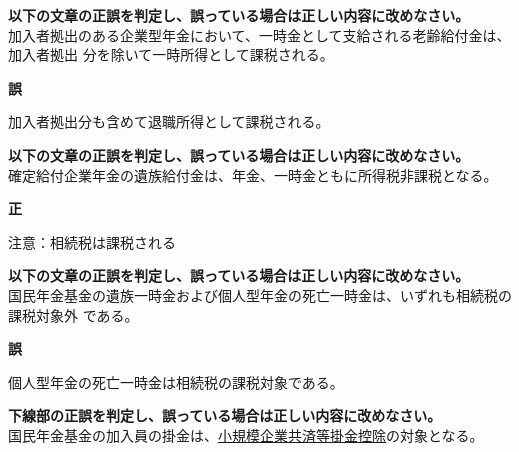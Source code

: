 \begin{truefalse}[年金1 2019 問題2(1)\textcircled{1}]
\textbf{以下の文章の正誤を判定し、誤っている場合は正しい内容に改めなさい。}
\\  

加入者拠出のある企業型年金において、一時金として支給される老齢給付金は、加入者拠出
分を除いて一時所得として課税される。
\end{truefalse}

\begin{answerbox}
  \textbf{誤}

加入者拠出分も含めて退職所得として課税される。
\end{answerbox}

\begin{truefalse}[年金1 2019 問題2(1)\textcircled{2}]
\textbf{以下の文章の正誤を判定し、誤っている場合は正しい内容に改めなさい。}
\\  

確定給付企業年金の遺族給付金は、年金、一時金ともに所得税非課税となる。
\end{truefalse}

\begin{answerbox}
  \textbf{正}
\end{answerbox}

\begin{explanationbox}
  注意：相続税は課税される
\end{explanationbox}



\begin{truefalse}[年金1 2019 問題2(1)\textcircled{3}]
\textbf{以下の文章の正誤を判定し、誤っている場合は正しい内容に改めなさい。}
\\  

国民年金基金の遺族一時金および個人型年金の死亡一時金は、いずれも相続税の課税対象外
である。
\end{truefalse}


\begin{answerbox}
  \textbf{誤}

  個人型年金の死亡一時金は相続税の課税対象である。
\end{answerbox}



\begin{truefalse}[年金1 H29 問題1(6)\textcircled{3}]
\textbf{下線部の正誤を判定し、誤っている場合は正しい内容に改めなさい。}
\\  

国民年金基金の加入員の掛金は、\underline{小規模企業共済等掛金控除}の対象となる。
\end{truefalse}

